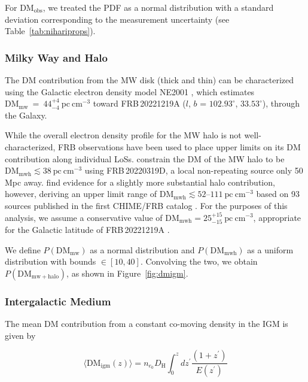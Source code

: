 \documentclass[twocolumn, linenumbers, tra]{aastex631}
\newcommand{\nihari}{FRB\,20221219A } %
\begin{document}
{For $\mathrm{DM}_{\mathrm{obs}}$, we treated the PDF as a normal distribution with a standard deviation corresponding to the measurement uncertainty (see Table~\ref{tab:nihariprops}).}

\subsubsection{Milky Way and Halo}\label{sec:mwdm}

The DM contribution from the MW disk (thick and thin) can be characterized using the Galactic electron density model NE2001 \citep{Cordes2002}, which estimates $\mathrm{DM}_{\mathrm{mw}}\ =\ 44^{+4}_{-4} \ \mathrm{pc} \ \mathrm{cm}^{-3}$ \citep[assuming $ \sim 10 \%$ uncertainty, following][]{Ocker2020} toward \nihari ($l$, $b$ = $102.93^{\circ}$, $33.53^{\circ}$), through the Galaxy. 

While the overall electron density profile for the MW halo is not well-characterized, FRB observations have been used to place upper limits on its DM contribution along individual LoSs. \citet{Ravi2023a} constrain the DM of the MW halo to be $\mathrm{DM}_{\mathrm{mwh}} \lesssim 38\ \mathrm{pc\ cm^{-3}}$ using FRB\,20220319D, a local non-repeating source only 50 Mpc away. \citet{Cook2023} find evidence for a slightly more substantial halo contribution, however, deriving an upper limit range of $\mathrm{DM}_{\mathrm{mwh}} \lesssim 52$--$111\ \mathrm{pc\ cm^{-3}}$ based on 93 sources published in the first CHIME/FRB catalog \citep{chime2021}. For the purposes of this analysis, we assume a conservative value of $\mathrm{DM}_{\mathrm{mwh}} = 25^{+15}_{-15}\ \mathrm{pc} \ \mathrm{cm}^{-3}$, appropriate for the Galactic latitude of \nihari.

We define $P\left(\mathrm{DM}_{\mathrm{mw}}\right)$ as a normal distribution and $P\left(\mathrm{DM}_{\mathrm{mwh}}\right)$ as a uniform distribution with bounds $\in[10,40]$. Convolving the two, we obtain $P\left(\mathrm{DM}_{\mathrm{mw + halo}}\right)$, as shown in Figure\ \ref{fig:dmigm}.

\subsubsection{Intergalactic Medium}\label{sec:igmdm}

The mean DM contribution from a constant co-moving density in the IGM is given by \citep[e.g.,][]{McQuinn2014}

\begin{equation}\label{eq:dmigm}
\langle\mathrm{DM}_{\mathrm{igm}}(z)\rangle = n_{e_0} D_{\mathrm{H}} \int_0^z d z^{\prime} \frac{\left(1+z^{\prime}\right)}{E\left(z^{\prime}\right)}
\end{equation}
\end{document}

